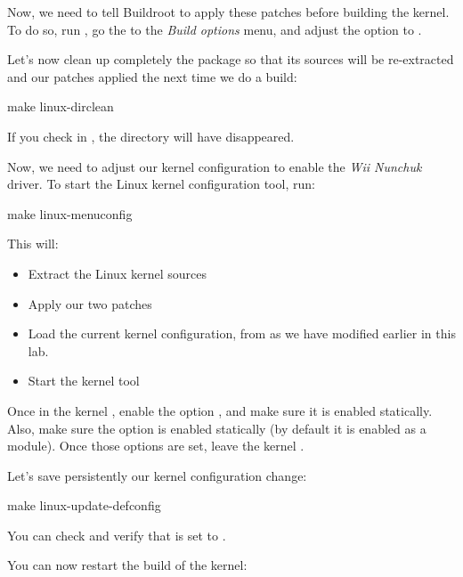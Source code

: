 Now, we need to tell Buildroot to apply these patches before building
the kernel. To do so, run , go the to the {\em Build
  options} menu, and adjust the  option
to .

Let's now clean up completely the  package so that its
sources will be re-extracted and our patches applied the next time we
do a build:

\begin{bashinput}
make linux-dirclean
\end{bashinput}

If you check in , the 
directory will have disappeared.

Now, we need to adjust our kernel configuration to enable the {\em Wii
Nunchuk} driver. To start the Linux kernel configuration tool, run:

\begin{bashinput}
make linux-menuconfig
\end{bashinput}

This will:

\begin{itemize}
\item Extract the Linux kernel sources
\item Apply our two patches
\item Load the current kernel configuration, from
   as we have modified
  earlier in this lab.
\item Start the kernel  tool
\end{itemize}

Once in the kernel , enable the option
, and make sure it is enabled
statically. Also, make sure the  option is
enabled statically (by default it is enabled as a module). Once those
options are set, leave the kernel .

Let's save persistently our kernel configuration change:

\begin{bashinput}
make linux-update-defconfig
\end{bashinput}

You can check  and
verify that  is set to .

You can now restart the build of the kernel:

